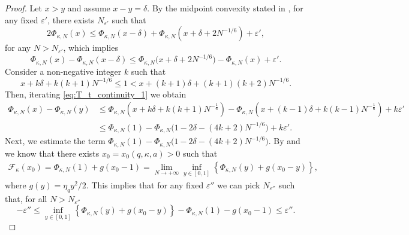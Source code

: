\documentclass[10pt,a4paper]{amsart}
\newcommand{\logq}{\eta_q}
\begin{document}
\begin{proof} 
    Let $x>y$ and assume $x-y=\delta$. By the midpoint convexity stated in , for any fixed $\varepsilon'$, there exists $N_{\varepsilon'}$ such that
   \begin{equation*}
        2 \Phi_{\kappa,N}(x) \le \Phi_{\kappa,N}(x-\delta) + \Phi_{\kappa,N}(x+\delta+2N^{-1/6}) + \varepsilon',
    \end{equation*}
    for any $N>N_{\varepsilon'}$, which implies
    \begin{equation} \label{eq:T_t_continuity_1}
        \Phi_{\kappa,N}(x) - \Phi_{\kappa,N}(x-\delta) \le \Phi_{\kappa,N}\big(x+\delta+2N^{-1/6}\big) - \Phi_{\kappa,N}(x) + \varepsilon'. 
    \end{equation}
    Consider a non-negative integer $k$ such that
    \begin{equation*}
       x+k\delta+k(k+1)N^{-1/6} \le 1 < x+(k+1)\delta+(k+1)(k+2)N^{-1/6}.
    \end{equation*}
    Then, iterating \eqref{eq:T_t_continuity_1} we obtain
    \begin{align} \nonumber
            \Phi_{\kappa,N}(x)-\Phi_{\kappa,N}(y) &\le \Phi_{\kappa,N}\left(x+k\delta+k(k+1)N^{-\frac16}\right)-\Phi_{\kappa,N}\left(x+(k-1)\delta+k(k-1)N^{-\frac16}\right) + k\varepsilon'
            \\
            &\le \Phi_{\kappa,N}(1) - \Phi_{\kappa,N}\bigg(1-2\delta-(4k+2)N^{-1/6}\bigg) + k\varepsilon'. \label{eq:T_t_continuity_2}
    \end{align}
    Next, we estimate the term $\Phi_{\kappa,N}(1) - \Phi_{\kappa,N}\big(1-2\delta-(4k+2)N^{-1/6}\big)$. By  and  we know that there exists $x_0=x_0(q,\kappa,a)>0$ such that 
    \begin{equation*}
    \begin{split}
        \mathcal{F}_\kappa(x_0) = \Phi_{\kappa,N}(1) + g(x_0-1) = \lim_{N \to +\infty} \inf_{y\in [0,1]} \left\{ \Phi_{\kappa,N}(y) + g(x_0-y) \right\},
    \end{split}
    \end{equation*}
    where $g(y)= \logq y^2/2 $.
    This implies that for any fixed $\varepsilon''$ we can pick $N_{\varepsilon''}$ such that, for all $N>N_{\varepsilon''}$
    \begin{equation*}
        -\varepsilon'' \le \inf_{y\in [0,1]} \left\{ \Phi_{\kappa,N}(y) + g(x_0-y) \right\} - \Phi_{\kappa,N}(1) - g(x_0-1) \le \varepsilon''.
    \end{equation*}

\end{proof}
\end{document}
